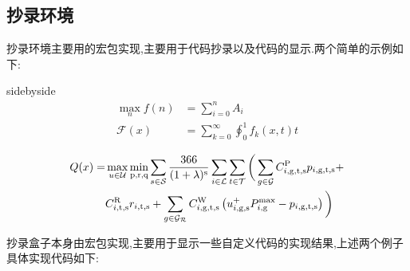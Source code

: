\subsection{抄录环境}
抄录环境主要用的宏包实现,主要用于代码抄录以及代码的显示.两个简单的示例如下:

\begin{tcblisting}{sidebyside}
\begin{align}
    \max_nf(n)&=\sum\nolimits_{i=0}^n A_i\\
    \mathcal{F}(x) &=\sum_{k=0}^\infty
    \oint_0^1 f_k(x,t) t
\end{align}
\end{tcblisting}

\begin{tcblisting}{}
\begin{align}\begin{aligned}
        Q(x)=&\max \limits_{u\in {\cal U}} \min\limits_\text{p,r,q}
        \sum\limits_{s\in {\cal S}} \frac{366}{(1+\lambda )^{\rm s}}\sum\limits_{i\in
            {\cal L}} \sum\limits_{t\in {\cal T}} \bigg(\sum\limits_{g\in {\cal G}}
        C_{i,\rm {g,t,s}}^{\rm P} p_{i,\rm {g,t,s}}+\\
        &C_{i,\rm {t,s}}^{\rm R} r_{i,\rm {t,s}}+
        \sum\limits_{g\in {\cal {G_{\cal R}}}}C_{i,\rm {g,t,s}}^{\rm W} \left(u_{i,\rm {g,s}}^{+}
        P_{i,\rm g}^{\max} -p_{i,\rm {g,t,s}}\right)\bigg)
\end{aligned}\end{align}
\end{tcblisting}
抄录盒子本身由宏包实现,主要用于显示一些自定义代码的实现结果,上述两个例子具体实现代码如下:

